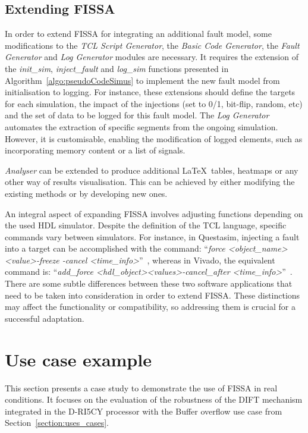 \subsection{Extending FISSA}

In order to extend FISSA for integrating an additional fault model, some modifications to the \textit{TCL Script Generator}, the \textit{Basic Code Generator}, the \textit{Fault Generator} and \textit{Log Generator} modules are necessary. 
It requires the extension of the \textit{init\_sim}, \textit{inject\_fault} and \textit{log\_sim} functions presented in Algorithm~\ref{algo:pseudoCodeSimus} to implement the new fault model from initialisation to logging. 
For instance, these extensions should define the targets for each simulation, the impact of the injections (set to 0/1, bit-flip, random, etc) and the set of data to be logged for this fault model.
The \textit{Log Generator} automates the extraction of specific segments from the ongoing simulation. However, it is customisable, enabling the modification of logged elements, such as incorporating memory content or a list of signals.

\textit{Analyser} can be extended to produce additional \LaTeX~tables, heatmaps or any other way of results visualisation. This can be achieved by either modifying the existing methods or by developing new ones.

An integral aspect of expanding FISSA involves adjusting functions depending on the used HDL simulator. Despite the definition of the TCL language, specific commands vary between simulators. For instance, in Questasim, injecting a fault into a target can be accomplished with the command: “\textit{force \textless object\_name\textgreater \textless value\textgreater -freeze -cancel \textless time\_info\textgreater}”~\cite{modelsim-force}, whereas in Vivado, the equivalent command is: “\textit{add\_force \textless hdl\_object\textgreater \textless values\textgreater -cancel\_after \textless time\_info\textgreater}”~\cite{vivado-force}.
There are some subtle differences between these two software applications that need to be taken into consideration in order to extend FISSA. These distinctions may affect the functionality or compatibility, so addressing them is crucial for a successful adaptation.

\section{Use case example}
\label{section:exampleApplication_fissa}
This section presents a case study to demonstrate the use of FISSA in real conditions. It focuses on the evaluation of the robustness of the DIFT mechanism integrated in the D-RI5CY processor with the Buffer overflow use case from Section~\ref{section:uses_cases}.

